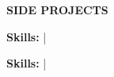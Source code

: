 %
%
%
%
%



\vspace{\spaceBeforeSection}
\textbf{SIDE PROJECTS} \hrulefill
\vspace{\spaceAfterSection}

\sideProjA \hfill \sideProjADate

\begin{small}
\textbf{Skills: \sideProjASkills} | \sideProjAFor
\end{small}

\medskip

\sideProjB \hfill \sideProjBDate

\begin{small}
\textbf{Skills: \sideProjBSkills} | \sideProjBFor
\end{small}
